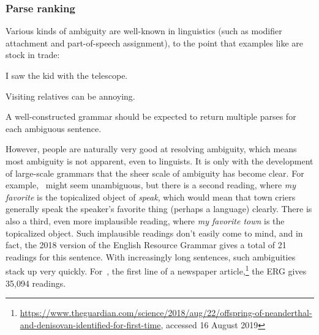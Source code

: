 \documentclass[output=paper,nonflat]{langsci/langscibook}
\begin{document}
\subsubsection{Parse ranking}
\label{cl:prac:rank}

Various kinds of ambiguity are well-known in linguistics
(such as modifier attachment and part-of-speech assignment),
to the point that examples like  are stock in trade:

\begin{exe}
\ex\label{cl:ambig-telescope} 
\begin{xlist}
\item I saw the kid with the telescope.
\item Visiting relatives can be annoying.
\end{xlist}
\end{exe}


\noindent
A well-constructed grammar should be expected to return multiple
parses for each ambiguous sentence.

However, people are naturally very good at resolving ambiguity,
which means most ambiguity is not apparent, even to linguists.
It is only with the development of large-scale grammars that the sheer scale of ambiguity has become clear.
For example, ~might seem unambiguous,
but there is a second reading, where \textit{my favorite} is the topicalized object of \textit{speak},
which would mean that town criers generally speak the speaker's favorite thing (perhaps a language) clearly.
There is also a third, even more implausible reading, where \textit{my favorite town} is the topicalized object.
Such implausible readings don't easily come to mind,
and in fact, the 2018 version of the English Resource Grammar \citep[ERG;][]{Flickinger2000a,Flickinger2011a-u}
gives a total of 21 readings for this sentence.
With increasingly long sentences, such ambiguities stack up very quickly.
For~, the first line of a newspaper article,\footnote{%
	\url{https://www.theguardian.com/science/2018/aug/22/offspring-of-neanderthal-and-denisovan-identified-for-first-time}, accessed 16 August 2019}
the ERG gives 35,094 readings.
\end{document}

